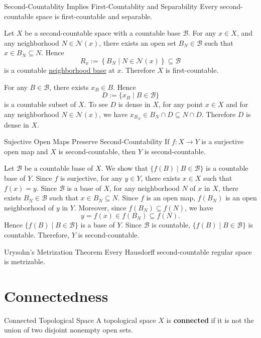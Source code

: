 \documentclass{report}
\begin{document}
\begin{proposition}{Second-Countablity Implies First-Countablity and Separability}{}
	Every second-countable space is first-countable and separable.
\end{proposition}
\begin{prf}
	Let $X$ be a second-countable space with a countable base $\mathcal{B}$. For any $x\in X$, and any neighborhood $N\in\mathcal{N}(x)$, there exists an open set $B_N\in \mathcal{B}$ such that $x\in B_N\subseteq N$. Hence 
	\[  
		R_x:=\left\{B_N \mid N\in\mathcal{N}(x)\right\} \subseteq \mathcal{B}
	\] 
	is a countable \hyperref[th:neighborhood_base]{neighborhood base} at $x$. Therefore $X$ is first-countable.

	For any $B\in\mathcal{B}$, there exists $x_B\in B$. Hence
	\[
		D:=\{x_B\mid B\in\mathcal{B}\}
	\]
	is a countable subset of $X$. To see $D$ is dense in $X$, for any point $x \in X$ and for any neighborhood $N\in\mathcal{N}(x)$, we have $x_{B_N}\in B_N \cap D\subseteq N \cap D $. Therefore $D$ is dense in $X$.
\end{prf}

\begin{proposition}{Sujective Open Maps Preserve Second-Countability}{}
	If $f:X\to Y$ is a surjective open map and $X$ is second-countable, then $Y$ is second-countable.
\end{proposition}
\begin{prf}
	Let $\mathcal{B}$ be a countable base of $X$. We show that $\{f(B)\mid B\in \mathcal{B}\}$ is a countable base of $Y$. Since $f$ is surjective, for any $y\in Y$, there exists $x\in X$ such that $f(x)=y$. Since $\mathcal{B}$ is a base of $X$, for any neighborhood $N$ of $x$ in $X$, there exists $B_N\in \mathcal{B}$ such that $x\in B_N\subseteq N$. Since $f$ is an open map, $f(B_N)$ is an open neighborhood of $y$ in $Y$. Moreover, since $f(B_N)\subseteq f(N)$, we have
	\[
		y=f(x)\in f(B_N)\subseteq f(N).
	\]
	Hence $\{f(B)\mid B\in \mathcal{B}\}$ is a base of $Y$. Since $\mathcal{B}$ is countable, $\{f(B)\mid B\in \mathcal{B}\}$ is countable. Therefore, $Y$ is second-countable.
\end{prf}

\begin{theorem}{Urysohn's Metrization Theorem}{}
	Every Hausdorff second-countable regular space is metrizable.
\end{theorem}


\section{Connectedness}
\begin{definition}{Connected Topological Space}{}
	A topological space $X$ is \textbf{connected} if it is not the union of two disjoint nonempty open sets.
\end{definition}
\end{document}
